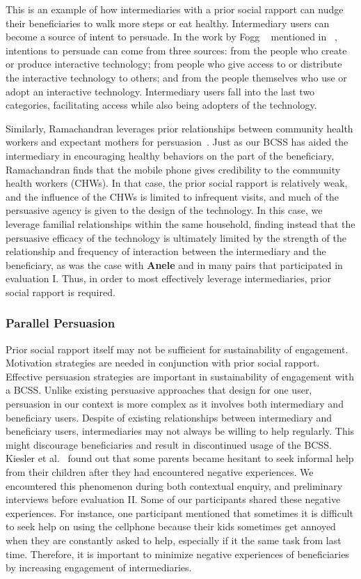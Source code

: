 \documentclass{sig-alternate}
\begin{document}
This is an example of how intermediaries with a prior social rapport can nudge
their beneficiaries to walk more steps or eat healthy. Intermediary users can
become a source of intent to persuade. In the work by Fogg
~\cite{fogg1998persuasive} mentioned in ~\cite{Oinas-kukkonen:psd}, intentions
to persuade can come from three sources: from the people who
create or produce interactive technology; from people who give access to or
distribute the interactive technology to others; and from the people themselves who use or adopt an interactive
technology. 
Intermediary users fall into the last two categories, facilitating
access while also being adopters of the technology.

Similarly, Ramachandran leverages prior relationships between community
health workers and expectant mothers for 
persuasion~\cite{ramachandran2010mobile,ramachandran2010research}.  
Just as our BCSS has aided the intermediary in encouraging healthy
behaviors on the part of the beneficiary, Ramachandran finds that
the mobile phone gives credibility to the community health workers (CHWs). 
In that
case, the prior social rapport is relatively weak, and the 
influence of the CHWs is limited to infrequent visits, and much of the
persuasive agency is given to the design of the technology. In this case,
we leverage familial relationships within the same household, finding
instead that the persuasive efficacy of the technology is ultimately limited
by the strength of the relationship and frequency of interaction between
the intermediary and the beneficiary, as was the case with \textbf{Anele} 
and in many pairs that participated in evaluation I. 
Thus, in order to most effectively 
leverage intermediaries, prior social rapport is required.

\subsubsection*{\textbf{Parallel Persuasion}} 
Prior social rapport itself may not be sufficient for sustainability of 
engagement. Motivation strategies are needed in conjunction with prior social 
rapport. Effective persuasion strategies are important in sustainability of 
engagement with a BCSS.  Unlike existing persuasive approaches that design for 
one user, persuasion in our context is more complex as it involves both 
intermediary and beneficiary users. 
Despite of existing relationships between intermediary and
beneficiary users, intermediaries may not always be willing to help regularly.
This might discourage beneficiaries and result in discontinued usage of the 
BCSS.
Kiesler et al.~\cite{kiesler:twi} found out that some parents became hesitant
to seek informal help from their children after they had encountered negative
experiences. We encountered this phenomenon during both contextual enquiry,
and preliminary interviews before evaluation II. Some of our participants
shared these negative experiences. For instance, one participant mentioned that
sometimes it is difficult to seek help on using the cellphone because their kids
sometimes get annoyed when they are constantly asked to help, especially if it
the same task from last time. Therefore, it is important to minimize negative
experiences of beneficiaries by increasing engagement of intermediaries.
\end{document}
